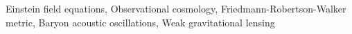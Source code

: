 \documentclass[twocolumn]{aastex631}
\begin{document}
Einstein field equations, Observational cosmology, Friedmann-Robertson-Walker metric, Baryon acoustic oscillations, Weak gravitational lensing
\end{document}
